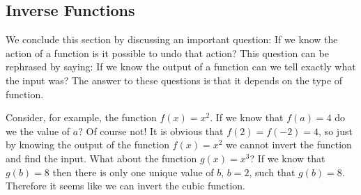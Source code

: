 

\subsection*{Inverse Functions}
We conclude this section by discussing an important question:  If we know the action of a
function is it possible to undo that action? This question can be rephrased by saying: If
we know the output of a function can we tell exactly what the input was?  The answer to
these questions is that it depends on the type of function.  

Consider, for example, the function $f(x) = x^2$.  If we know that $f(a) = 4$ do we the
value of $a$?  Of course not!  It is obvious that $f(2) = f(-2) = 4$, so just by knowing
the output of the function $f(x) = x^2$ we cannot invert the function and find the input.
What about the function $g(x) = x^3$?  If we know that $g(b) = 8$ then there is only one
unique value of $b$, $b=2$, such that $g(b) = 8$.  Therefore it seems like we can invert
the cubic function.  

